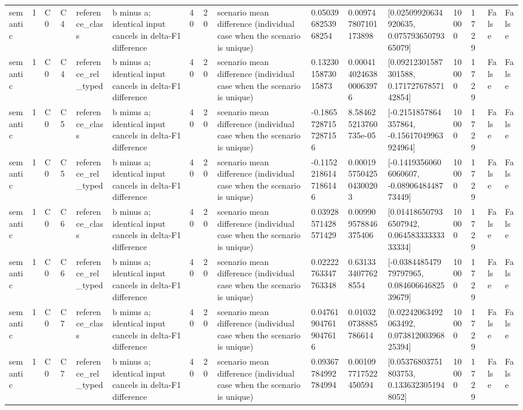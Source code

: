 \begin{tabular}{llllllllllllllll}
semantic & 1 & C0 & C4 & reference\_class & b minus a; identical input cancels in delta-F1 difference & 40 & 20 & scenario mean difference (individual case when the scenario is unique) & 0.0503968253968254 & 0.009747807101173898 & [0.02509920634920635, 0.07579365079365079] & 10000 & 1729 & False & False \\
semantic & 1 & C0 & C4 & reference\_rel\_typed & b minus a; identical input cancels in delta-F1 difference & 40 & 20 & scenario mean difference (individual case when the scenario is unique) & 0.1323015873015873 & 0.00041402463800063976 & [0.09212301587301588, 0.17172767857142854] & 10000 & 1729 & False & False \\
semantic & 1 & C0 & C5 & reference\_class & b minus a; identical input cancels in delta-F1 difference & 40 & 20 & scenario mean difference (individual case when the scenario is unique) & -0.18657287157287156 & 8.584625213760735e-05 & [-0.2151857864357864, -0.15617049963924964] & 10000 & 1729 & False & False \\
semantic & 1 & C0 & C5 & reference\_rel\_typed & b minus a; identical input cancels in delta-F1 difference & 40 & 20 & scenario mean difference (individual case when the scenario is unique) & -0.11522186147186146 & 0.00019575042504300203 & [-0.14193560606060607, -0.0890648448773449] & 10000 & 1729 & False & False \\
semantic & 1 & C0 & C6 & reference\_class & b minus a; identical input cancels in delta-F1 difference & 40 & 20 & scenario mean difference (individual case when the scenario is unique) & 0.03928571428571429 & 0.009909578846375406 & [0.014186507936507942, 0.06458333333333334] & 10000 & 1729 & False & False \\
semantic & 1 & C0 & C6 & reference\_rel\_typed & b minus a; identical input cancels in delta-F1 difference & 40 & 20 & scenario mean difference (individual case when the scenario is unique) & 0.02222763347763348 & 0.6313334077628554 & [-0.038448547979797965, 0.08460664682539679] & 10000 & 1729 & False & False \\
semantic & 1 & C0 & C7 & reference\_class & b minus a; identical input cancels in delta-F1 difference & 40 & 20 & scenario mean difference (individual case when the scenario is unique) & 0.047619047619047616 & 0.010320738885786614 & [0.02242063492063492, 0.07381200396825394] & 10000 & 1729 & False & False \\
semantic & 1 & C0 & C7 & reference\_rel\_typed & b minus a; identical input cancels in delta-F1 difference & 40 & 20 & scenario mean difference (individual case when the scenario is unique) & 0.09367784992784994 & 0.001097717522450594 & [0.05376803751803753, 0.1336323051948052] & 10000 & 1729 & False & False \\

\end{tabular}
